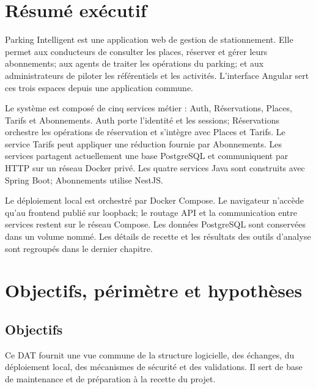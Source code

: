 \documentclass[11pt,a4paper]{report}
\begin{document}
\chapter{Résumé exécutif}
Parking Intelligent est une application web de gestion de stationnement. Elle permet aux conducteurs de consulter les places, réserver et gérer leurs abonnements; aux agents de traiter les opérations du parking; et aux administrateurs de piloter les référentiels et les activités. L'interface Angular sert ces trois espaces depuis une application commune.

Le système est composé de cinq services métier : Auth, Réservations, Places, Tarifs et Abonnements. Auth porte l'identité et les sessions; Réservations orchestre les opérations de réservation et s'intègre avec Places et Tarifs. Le service Tarifs peut appliquer une réduction fournie par Abonnements. Les services partagent actuellement une base PostgreSQL et communiquent par HTTP sur un réseau Docker privé. Les quatre services Java sont construits avec Spring Boot; Abonnements utilise NestJS.

Le déploiement local est orchestré par Docker Compose. Le navigateur n'accède qu'au frontend publié sur loopback; le routage API et la communication entre services restent sur le réseau Compose. Les données PostgreSQL sont conservées dans un volume nommé. Les détails de recette et les résultats des outils d'analyse sont regroupés dans le dernier chapitre.

\chapter{Objectifs, périmètre et hypothèses}
\section{Objectifs}
Ce DAT fournit une vue commune de la structure logicielle, des échanges, du déploiement local, des mécanismes de sécurité et des validations. Il sert de base de maintenance et de préparation à la recette du projet.
\end{document}
